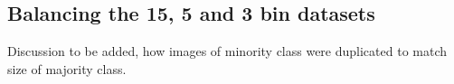 

 


    


\subsection{Balancing the 15, 5 and 3 bin datasets}
Discussion to be added, how images of minority class were duplicated to match size of majority class.

